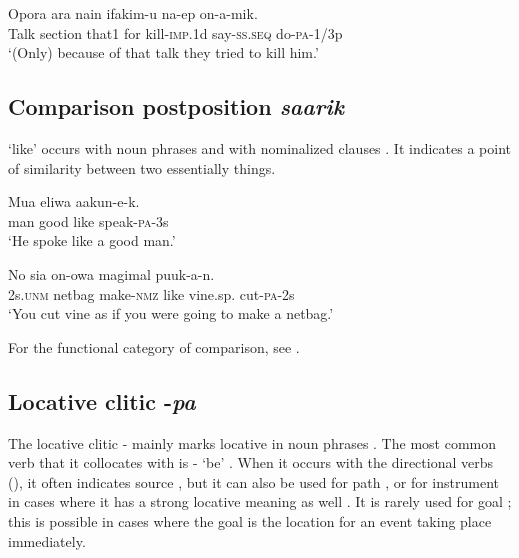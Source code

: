 \ea%
\label{ex:3:x759}
\gll Opora ara nain  ifakim-u na-ep on-a-mik. \\
Talk section that1 for kill-\textsc{imp}.1d say-\textsc{ss}.\textsc{seq} do-\textsc{pa}-1/3p\\
\glt`(Only) because of that talk they tried to kill him.'
\z

\subsection{Comparison postposition \textit{saarik}}\label{sec:3.12.3}
{}
 `like' occurs with noun phrases  and with nominalized clauses . It indicates a point of similarity between two essentially  things.

\ea%
\label{ex:3:x760}
\gll Mua eliwa  aakun-e-k. \\
man good like speak-\textsc{pa}-3s\\
\glt`He spoke like a good man.'
\z

\ea%
\label{ex:3:x761}
\gll No sia on-owa  magimal puuk-a-n. \\
2s.\textsc{unm} netbag make-\textsc{nmz} like vine.sp. cut-\textsc{pa}-2s\\
\glt`You cut  vine as if you were going to make a netbag.'
\z

For the functional category of comparison, see .

\subsection{Locative clitic -\textit{pa}}\label{sec:3.12.4}
{}
The locative clitic - mainly marks locative in noun phrases . The most common verb that it collocates with is - `be' . When it occurs with the directional verbs (), it often indicates source , but it can also be used for path , or for instrument in cases where it has a strong locative meaning as well . It is rarely used for goal ; this is possible in cases where the goal is the location for an event taking place immediately.

